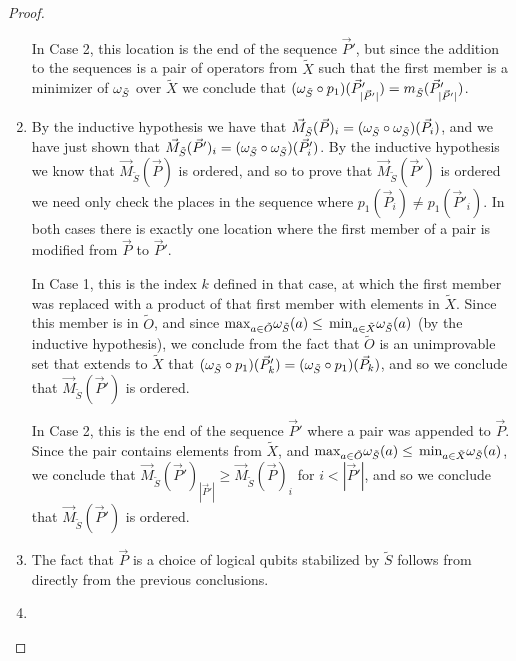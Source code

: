 \documentclass[twocolumn,showpacs,preprintnumbers,amsmath,amssymb,nofootinbib,pra,floatfix]{revtex4-1}
\newcommand{\lst}{\vec}
\newcommand{\set}{\tilde}
\begin{document}
\begin{proof}
\begin{enumerate}
In Case 2, this location is the end of the sequence $\lst P'$, but since the addition to the sequences is a pair of operators from $\set X$ such that the first member is a minimizer of $\om_{\set S}$ over $\set X$ we conclude that $(\om_{\set S}\circ p_1)(\lst P'_{|\lst P'|})=m_{\set S}(\lst P'_{|\lst P'|})$.
\item

By the inductive hypothesis we have that $\lst M_{\set S}(\lst P)_i=(\om_{\set S}\circ \om_{\set S})(\lst P_i)$, and we have just shown that $\lst M_{\set S}(\lst P')_i=(\om_{\set S}\circ \om_{\set S})(\lst P'_i)$.  By the inductive hypothesis we know that $\lst M_{\set S}(\lst P)$ is ordered, and so to prove that $\lst M_{\set S}(\lst P')$ is ordered we need only check the places in the sequence where $p_1(\lst P_i)\ne p_1(\lst P'_i)$.  In both cases there is exactly one location where the first member of a pair is modified from $\lst P$ to $\lst P'$.

In Case 1, this is the index $k$ defined in that case, at which the first member was replaced with a product of that first member with elements in $\set X$.  Since this member is in $\set O$, and since $\max_{a\in\set O}\om_{\set S}(a)\le\min_{a\in\set X}\om_{\set S}(a)$ (by the inductive hypothesis), we conclude from the fact that $\set O$ is an unimprovable set that extends to $\set X$ that $(\om_{\set S}\circ p_1)(\lst P'_k)=(\om_{\set S}\circ p_1)(\lst P_k)$, and so we conclude that $\lst M_{\set S}(\lst P')$ is ordered.

In Case 2, this is the end of the sequence $\lst P'$ where a pair was appended to $\lst P$.  Since the pair contains elements from $\set X$, and $\max_{a\in\set O}\om_{\set S}(a)\le\min_{a\in\set X}\om_{\set S}(a)$, we conclude that $\lst M_{\set S}(\lst P')_{|\lst P'|}\ge\lst M_{\set S}(\lst P)_i$ for $i<|\lst P'|$, and so we conclude that $\lst M_{\set S}(\lst P')$ is ordered.
\item

The fact that $\lst P$ is a choice of logical qubits stabilized by $\set S$ follows from directly from the previous conclusions.
\item


\end{enumerate}
\end{proof}
\end{document}
